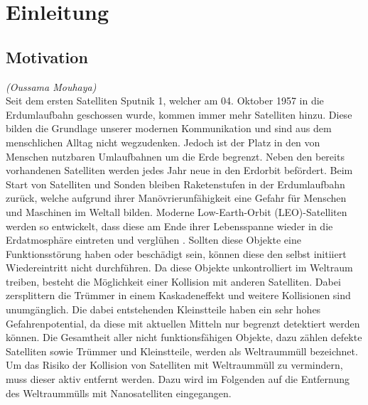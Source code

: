 \chapter{Einleitung}
		\section{Motivation}
	\hfill\emph{(Oussama Mouhaya)}\\
Seit dem ersten Satelliten Sputnik \num{1}, welcher am 04. Oktober 1957 in die Erdumlaufbahn geschossen wurde, kommen immer mehr Satelliten hinzu. Diese bilden die Grundlage unserer modernen Kommunikation und sind aus dem menschlichen Alltag nicht wegzudenken. Jedoch ist der Platz in den von Menschen nutzbaren Umlaufbahnen um die Erde begrenzt. Neben den bereits vorhandenen Satelliten werden jedes Jahr neue in den Erdorbit befördert. Beim Start von Satelliten und Sonden bleiben Raketenstufen in der Erdumlaufbahn zurück, welche aufgrund ihrer Manövrierunfähigkeit eine Gefahr für Menschen und Maschinen im Weltall bilden. Moderne Low-Earth-Orbit (LEO)-Satelliten werden so entwickelt, dass diese am Ende ihrer Lebensspanne wieder in die Erdatmosphäre eintreten und verglühen \cite{.e}. Sollten diese Objekte eine Funktionsstörung haben oder beschädigt sein, können diese den selbst initiiert Wiedereintritt nicht durchführen. Da diese Objekte unkontrolliert im Weltraum treiben, besteht die Möglichkeit einer Kollision mit anderen Satelliten. Dabei zersplittern die Trümmer in einem Kaskadeneffekt und weitere Kollisionen sind unumgänglich. Die dabei entstehenden Kleinstteile haben ein sehr hohes Gefahrenpotential, da diese mit aktuellen Mitteln nur begrenzt detektiert werden können. Die Gesamtheit aller nicht funktionsfähigen Objekte, dazu zählen defekte Satelliten sowie Trümmer und Kleinstteile, werden als Weltraummüll bezeichnet. Um das Risiko der Kollision von Satelliten mit Weltraummüll zu vermindern, muss dieser aktiv entfernt werden. Dazu wird im Folgenden auf die Entfernung des Weltraummülls mit Nanosatelliten eingegangen.

